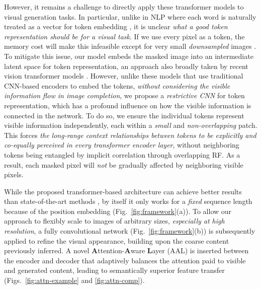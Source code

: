 \documentclass[10pt,twocolumn,letterpaper]{article}
\begin{document}
However, it remains a challenge to directly apply these transformer models to visual generation tasks. In particular, unlike in NLP where each word is naturally treated as a vector for token embedding \cite{Vaswani_NIPS2017_attention,devlin2018bert,radford2018improving,radford2019language}, it is unclear \emph{what a good token representation should be for a visual task}. If we use every pixel as a token, the memory cost will make this infeasible except for very small \emph{downsampled} images \cite{chen2020generative,Wan_2021_ICCV}. To mitigate this issue, our model embeds the masked image into an intermediate latent space for token representation, an approach also broadly taken by recent vision transformer models \cite{carion2020end,zhu2020deformable,esser2020taming,SETR,xiao2021early}. However, unlike these models that use traditional CNN-based encoders to embed the tokens, \emph{without considering the visible information flow in image completion}, we propose a \emph{restrictive CNN} for token representation, which has a profound influence on how the visible information is connected in the network. To do so, we ensure the individual tokens represent visible information independently, each within a \emph{small} and \emph{non-overlapping} patch. This forces \emph{the long-range context relationships between tokens to be explicitly and co-equally perceived in every transformer encoder layer}, without neighboring tokens being entangled by implicit correlation through overlapping RF. As a result, each masked pixel will \emph{not} be gradually affected by neighboring visible pixels. 

While the proposed transformer-based architecture can achieve better results than state-of-the-art methods \cite{yu2018generative,Zheng_2019_CVPR,yi2020contextual,esser2020taming}, by itself it only works for a \emph{fixed} sequence length because of the position embedding (Fig.~\ref{fig:framework}(a)). To allow our approach to flexibly scale to images of arbitrary sizes, \emph{especially at high resolution}, a fully convolutional network (Fig.~\ref{fig:framework}(b)) is subsequently applied to refine the visual appearance, building upon the coarse content previously inferred. A novel \textbf{A}ttention-\textbf{A}ware \textbf{L}ayer (AAL) is inserted between the encoder and decoder that adaptively balances the attention paid to visible and generated content, leading to semantically superior feature transfer (Figs.\ \ref{fig:attn-example} and \ref{fig:attn-comp}). 
\end{document}
